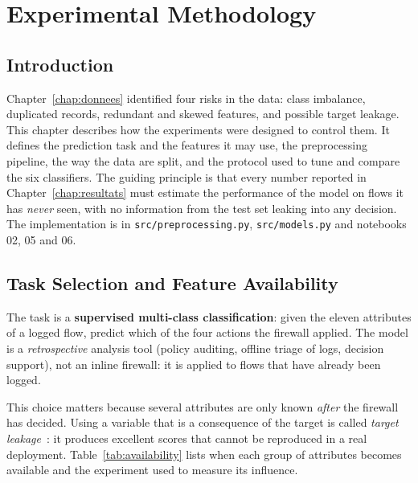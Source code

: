 \chapter{Experimental Methodology}\label{chap:methodologie}

\section{Introduction}
Chapter~\ref{chap:donnees} identified four risks in the data: class imbalance, duplicated records, redundant and skewed features, and possible target leakage. This chapter describes how the experiments were designed to control them. It defines the prediction task and the features it may use, the preprocessing pipeline, the way the data are split, and the protocol used to tune and compare the six classifiers. The guiding principle is that every number reported in Chapter~\ref{chap:resultats} must estimate the performance of the model on flows it has \emph{never} seen, with no information from the test set leaking into any decision. The implementation is in \texttt{src/preprocessing.py}, \texttt{src/models.py} and notebooks 02, 05 and 06.

\section{Task Selection and Feature Availability}\label{sec:availability}
The task is a \textbf{supervised multi-class classification}: given the eleven attributes of a logged flow, predict which of the four actions the firewall applied. The model is a \emph{retrospective} analysis tool (policy auditing, offline triage of logs, decision support), not an inline firewall: it is applied to flows that have already been logged.

This choice matters because several attributes are only known \emph{after} the firewall has decided. Using a variable that is a consequence of the target is called \emph{target leakage}~\cite{kaufman2012leakage}: it produces excellent scores that cannot be reproduced in a real deployment. Table~\ref{tab:availability} lists when each group of attributes becomes available and the experiment used to measure its influence.


